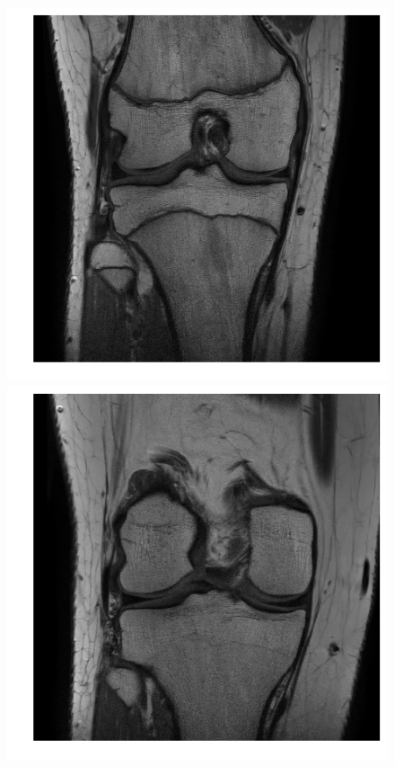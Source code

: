 \begin{figure}[H]
\endminipage\hfill
{}%
  \includegraphics[width=\linewidth]{imgs/transfer_size_x3.png}
\endminipage\hfill
{}%
  \includegraphics[width=\linewidth]{imgs/transfer_size_x4.png}

\end{figure}
